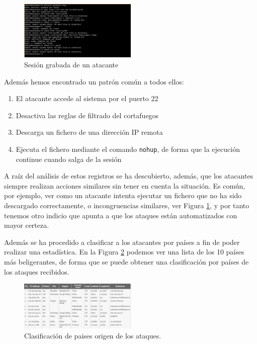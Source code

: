 \documentclass[journal]{IEEEtran}
\begin{document}
\begin{figure}[H]
\centering
\includegraphics[width=0.5\textwidth]{img/session}
\caption{Sesión grabada de un atacante}
\label{fig:session}
\end{figure}

Además hemos encontrado un patrón común a todos ellos:
\begin{enumerate}
\item El atacante accede al sistema por el puerto 22
\item Desactiva las reglas de filtrado del cortafuegos
\item Descarga un fichero de una dirección IP remota
\item Ejecuta el fichero mediante el comando {\tt nohup}, de forma que la ejecución continue cuando salga de la sesión
\end{enumerate}

A raíz del análisis de estos registros se ha descubierto, además, que los atacantes siempre realizan acciones similares sin tener en cuenta la situación. Es común, por ejemplo, ver como un atacante intenta ejecutar un fichero que no ha sido descargado correctamente, o incongruencias similares, ver Figura \ref{fig:session}, y por tanto tenemos otro indicio que apunta a que los ataques están automatizados con mayor certeza.

Además se ha procedido a clasificar a los atacantes por países a fin de poder realizar una estadística. En la Figura \ref{fig:country_profiling} podemos ver una lista de los 10 países más beligerantes, de forma que se puede obtener una clasificación por países de los ataques recibidos.

\begin{figure}[H]
\centering
\includegraphics[width=0.5\textwidth]{img/country_profiling}
\caption{Clasificación de paises origen de los ataques.}
\label{fig:country_profiling}
\end{figure}
\end{document}

